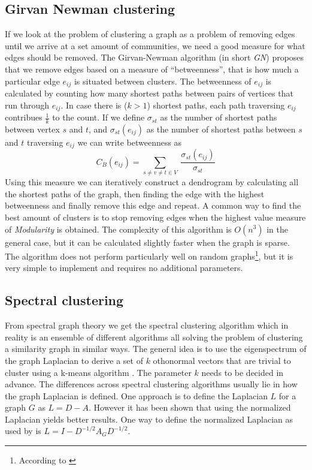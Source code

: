 \subsection{Girvan Newman clustering}
If we look at the problem of clustering a graph as a problem of removing 
edges until we arrive at a set amount of communities, we need a good 
measure for what edges should be removed. The Girvan-Newman algorithm 
(in short \emph{GN}) proposes that we remove edges based on a measure of 
``betweenness'', that is how much a particular edge $e_{ij}$ is situated 
between clusters. The betweenness of $e_{ij}$ is calculated by counting 
how many shortest paths between pairs of vertices that run through 
$e_{ij}$. In case there is ($k > 1$) shortest paths, each path 
traversing $e_{ij}$ contribues $\frac{1}{k}$ to the count.  If we define 
$\sigma_{st}$ as the number of shortest paths between vertex $s$ and 
$t$, and $\sigma_{st}(e_{ij})$ as the number of shortest paths between 
$s$ and $t$ traversing $e_{ij}$ we can write betweenness as
\begin{equation}
	C_B(e_{ij})= \sum_{s \neq v \neq t \in V} \
	\frac{\sigma_{st}(e_{ij})}{\sigma_{st}}
\end{equation}
Using this measure we can iteratively construct a dendrogram by 
calculating all the shortest paths of the graph, then finding the edge 
with the highest betweenness and finally remove this edge and repeat. A 
common way to find the best amount of clusters is to stop removing edges 
when the highest value measure of \emph{Modularity} is obtained.
The complexity of this algorithm is $O(n^3)$ in the general case, but it
can be calculated slightly faster when the graph is sparse. The 
algorithm does not perform particularly well on random 
graphs\footnote{According to \cite{lancichinetti2009}}, but it is very 
simple to implement and requires no additional parameters.



\subsection{Spectral clustering}
From spectral graph theory we get the spectral clustering algorithm 
which in reality is an ensemble of different algorithms all solving the 
problem of clustering a similarity graph in similar ways. The general 
idea is to use the eigenspectrum of the graph Laplacian to derive a set 
of $k$ othonormal vectors that are trivial to cluster using a k-means 
algorithm \cite[pp. 3]{von2007}. The parameter $k$ needs to be decided 
in advance. The differences across spectral clustering algorithms 
usually lie in how the graph Laplacian is defined.  One approach is to 
define the Laplacian $L$ for a graph $G$ as $L = D - A$.  However it has 
been shown that using the normalized Laplacian yields better results.  
One way to define the normalized Laplacian as used by \cite{ng2002} is 
$L = I - D^{-1/2} A_G D^{-1/2}$.

